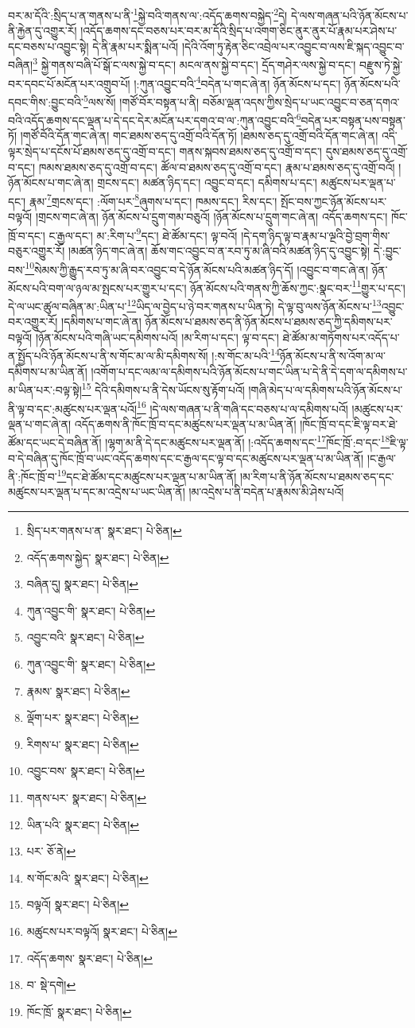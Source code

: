 བར་མ་དོའི་:སྲིད་པ་ན་གནས་པ་ནི་\footnote{སྲིད་པར་གནས་པ་ན་  སྣར་ཐང་།  པེ་ཅིན། }སྐྱེ་བའི་གནས་ལ་:འདོད་ཆགས་བསྐྱེད་\footnote{འདོད་ཆགས་སྐྱེད་  སྣར་ཐང་།  པེ་ཅིན། }དེ། དེ་ལས་གཞན་པའི་ཉོན་མོངས་པ་ནི་རྐྱེན་དུ་འགྱུར་རོ། །འདོད་ཆགས་དང་བཅས་པར་བར་མ་དོའི་སྲིད་པ་འགག་ཅིང་ནུར་ནུར་པོ་རྣམ་པར་ཤེས་པ་དང་བཅས་པ་འབྱུང་སྟེ། དེ་ནི་རྣམ་པར་སྨིན་པའོ། །དེའི་འོག་ཏུ་རྟེན་ཅིང་འབྲེལ་པར་འབྱུང་བ་ལས་ཇི་སྐད་འབྱུང་བ་བཞིན།\footnote{བཞིན་དུ།  སྣར་ཐང་།  པེ་ཅིན། } སྐྱེ་གནས་བཞི་པོ་སྒོ་ང་ལས་སྐྱེ་བ་དང་། མངལ་ནས་སྐྱེ་བ་དང་། དྲོད་གཤེར་ལས་སྐྱེ་བ་དང་། བརྫུས་ཏེ་སྐྱེ་བར་དབང་པོ་མངོན་པར་འགྲུབ་པོ། །:ཀུན་འབྱུང་བའི་\footnote{ཀུན་འབྱུང་གི་  སྣར་ཐང་།  པེ་ཅིན། }བདེན་པ་གང་ཞེ་ན། ཉོན་མོངས་པ་དང་། ཉོན་མོངས་པའི་དབང་གིས་:བྱུང་བའི་\footnote{འབྱུང་བའི་  སྣར་ཐང་།  པེ་ཅིན། }ལས་སོ། །གཙོ་བོར་བསྟན་པ་ནི། བཅོམ་ལྡན་འདས་ཀྱིས་སྲེད་པ་ཡང་འབྱུང་བ་ཅན་དགའ་བའི་འདོད་ཆགས་དང་ལྡན་པ་དེ་དང་དེར་མངོན་པར་དགའ་བ་ལ་:ཀུན་འབྱུང་བའི་\footnote{ཀུན་འབྱུང་གི་  སྣར་ཐང་།  པེ་ཅིན། }བདེན་པར་བསྟན་པས་བསྟན་ཏོ། །གཙོ་བོའི་དོན་གང་ཞེ་ན། གང་ཐམས་ཅད་དུ་འགྲོ་བའི་དོན་ཏོ། །ཐམས་ཅད་དུ་འགྲོ་བའི་དོན་གང་ཞེ་ན། འདི་ལྟར་སྲེད་པ་དངོས་པོ་ཐམས་ཅད་དུ་འགྲོ་བ་དང་། གནས་སྐབས་ཐམས་ཅད་དུ་འགྲོ་བ་དང་། དུས་ཐམས་ཅད་དུ་འགྲོ་བ་དང་། ཁམས་ཐམས་ཅད་དུ་འགྲོ་བ་དང་། ཚོལ་བ་ཐམས་ཅད་དུ་འགྲོ་བ་དང་། རྣམ་པ་ཐམས་ཅད་དུ་འགྲོ་བའོ། །ཉོན་མོངས་པ་གང་ཞེ་ན། གྲངས་དང་། མཚན་ཉིད་དང་། འབྱུང་བ་དང་། དམིགས་པ་དང་། མཚུངས་པར་ལྡན་པ་དང་། རྣམ་\footnote{རྣམས་  སྣར་ཐང་།  པེ་ཅིན། }གྲངས་དང་། :ལོག་པར་\footnote{ལྡོག་པར་  སྣར་ཐང་།  པེ་ཅིན། }ཞུགས་པ་དང་། ཁམས་དང་། རིས་དང་། སྤོང་བས་ཀྱང་ཉོན་མོངས་པར་བལྟའོ། །གྲངས་གང་ཞེ་ན། ཉོན་མོངས་པ་དྲུག་གམ་བཅུའོ། །ཉོན་མོངས་པ་དྲུག་གང་ཞེ་ན། འདོད་ཆགས་དང་། ཁོང་ཁྲོ་བ་དང་། ང་རྒྱལ་དང་། མ་:རིག་པ་\footnote{རིགས་པ་  སྣར་ཐང་།  པེ་ཅིན། }དང་། ཐེ་ཚོམ་དང་། ལྟ་བའོ། །དེ་དག་ཉིད་ལྟ་བ་རྣམ་པ་ལྔའི་བྱེ་བྲག་གིས་བཅུར་འགྱུར་རོ། །མཚན་ཉིད་གང་ཞེ་ན། ཆོས་གང་འབྱུང་བ་ན་རབ་ཏུ་མ་ཞི་བའི་མཚན་ཉིད་དུ་འབྱུང་སྟེ། དེ་:བྱུང་བས་\footnote{འབྱུང་བས་  སྣར་ཐང་།  པེ་ཅིན། }སེམས་ཀྱི་རྒྱུད་རབ་ཏུ་མ་ཞི་བར་འབྱུང་བ་དེ་ཉོན་མོངས་པའི་མཚན་ཉིད་དོ། །འབྱུང་བ་གང་ཞེ་ན། ཉོན་མོངས་པའི་བག་ལ་ཉལ་མ་སྤངས་པར་གྱུར་པ་དང་། ཉོན་མོངས་པའི་གནས་ཀྱི་ཆོས་ཀྱང་:སྣང་བར་\footnote{གནས་པར་  སྣར་ཐང་།  པེ་ཅིན། }གྱུར་པ་དང་། དེ་ལ་ཡང་ཚུལ་བཞིན་མ་:ཡིན་པ་\footnote{ཡིན་པའི་  སྣར་ཐང་།  པེ་ཅིན། }ཡིད་ལ་བྱེད་པ་ཉེ་བར་གནས་པ་ཡིན་ཏེ། དེ་ལྟ་བུ་ལས་ཉོན་མོངས་པ་\footnote{པར་  ཅོ་ནེ། }འབྱུང་བར་འགྱུར་རོ། །དམིགས་པ་གང་ཞེ་ན། ཉོན་མོངས་པ་ཐམས་ཅད་ནི་ཉོན་མོངས་པ་ཐམས་ཅད་ཀྱི་དམིགས་པར་བལྟའོ། །ཉོན་མོངས་པའི་གཞི་ཡང་དམིགས་པའོ། །མ་རིག་པ་དང་། ལྟ་བ་དང་། ཐེ་ཚོམ་མ་གཏོགས་པར་འདོད་པ་ན་སྤྱོད་པའི་ཉོན་མོངས་པ་ནི་ས་གོང་མ་ལ་མི་དམིགས་སོ། །:ས་གོང་མ་པའི་\footnote{ས་གོང་མའི་  སྣར་ཐང་།  པེ་ཅིན། }ཉོན་མོངས་པ་ནི་ས་འོག་མ་ལ་དམིགས་པ་མ་ཡིན་ནོ། །འགོག་པ་དང་ལམ་ལ་དམིགས་པའི་ཉོན་མོངས་པ་གང་ཡིན་པ་དེ་ནི་དེ་དག་ལ་དམིགས་པ་མ་ཡིན་པར་:བལྟ་སྟེ།\footnote{བལྟའོ།  སྣར་ཐང་།  པེ་ཅིན། } དེའི་དམིགས་པ་ནི་དེས་ཡོངས་སུ་རྟོག་པའོ། །གཞི་མེད་པ་ལ་དམིགས་པའི་ཉོན་མོངས་པ་ནི་ལྟ་བ་དང་:མཚུངས་པར་ལྡན་པའོ།\footnote{མཚུངས་པར་བལྟའོ།  སྣར་ཐང་།  པེ་ཅིན། } །དེ་ལས་གཞན་པ་ནི་གཞི་དང་བཅས་པ་ལ་དམིགས་པའོ། །མཚུངས་པར་ལྡན་པ་གང་ཞེ་ན། འདོད་ཆགས་ནི་ཁོང་ཁྲོ་བ་དང་མཚུངས་པར་ལྡན་པ་མ་ཡིན་ནོ། །ཁོང་ཁྲོ་བ་དང་ཇི་ལྟ་བར་ཐེ་ཚོམ་དང་ཡང་དེ་བཞིན་ནོ། །ལྷག་མ་ནི་དེ་དང་མཚུངས་པར་ལྡན་ནོ། །:འདོད་ཆགས་དང་\footnote{འདོད་ཆགས་  སྣར་ཐང་།  པེ་ཅིན། }ཁོང་ཁྲོ་:བ་དང་\footnote{བ་  སྡེ་དགེ། }ཇི་ལྟ་བ་དེ་བཞིན་དུ་ཁོང་ཁྲོ་བ་ཡང་འདོད་ཆགས་དང་ང་རྒྱལ་དང་ལྟ་བ་དང་མཚུངས་པར་ལྡན་པ་མ་ཡིན་ནོ། །ང་རྒྱལ་ནི་:ཁོང་ཁྲོ་བ་\footnote{ཁོང་ཁྲོ་  སྣར་ཐང་།  པེ་ཅིན། }དང་ཐེ་ཚོམ་དང་མཚུངས་པར་ལྡན་པ་མ་ཡིན་ནོ། །མ་རིག་པ་ནི་ཉོན་མོངས་པ་ཐམས་ཅད་དང་མཚུངས་པར་ལྡན་པ་དང་མ་འདྲེས་པ་ཡང་ཡིན་ནོ། །མ་འདྲེས་པ་ནི་བདེན་པ་རྣམས་མི་ཤེས་པའོ། 
